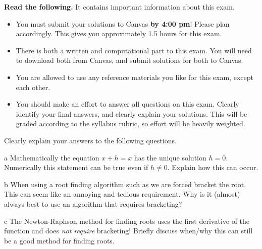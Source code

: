 \documentclass[]{homework}
\begin{document}

  \noindent\textbf{Read the following.} It contains important information
  about this exam.

  \begin{itemize}
    \item You must submit your solutions
    to Canvas \textbf{by 4:00 pm}! Please plan accordingly.
    This gives you approximately 1.5 hours for this exam.
    \item There is both a written and computational part to this exam. You
    will need to download both from Canvas, and submit solutions for both to Canvas.
    \item You are allowed to use any reference materials you like for this
      exam, except each other.
    \item You should make an effort to answer all questions on this exam.
      Clearly identify your final answers, and clearly explain your solutions.
      This will be graded according to the syllabus rubric, so effort will be
      heavily weighted.
  \end{itemize}



\begin{problem}{1}
  Clearly explain your answers to the following questions.
  \begin{subproblem}{a}
    Mathematically the equation $x+h=x$ has the unique solution $h=0$.
    Numerically this statement can be true even if $h\ne0$.
    Explain how this can occur.
  \end{subproblem}
  \begin{subproblem}{b}
    When using a root finding algorithm such as  we are forced bracket the root.
    This can seem like an annoying and tedious requirement.
    Why is it (almost) always best to use an algorithm that requires bracketing?
  \end{subproblem}
  \begin{subproblem}{c}
    The Newton-Raphson method for finding roots uses the first derivative of the function and does \emph{not require} bracketing!
    Briefly discuss when/why this can still be a good method for finding roots.
  \end{subproblem}
\end{problem}
\end{document}

